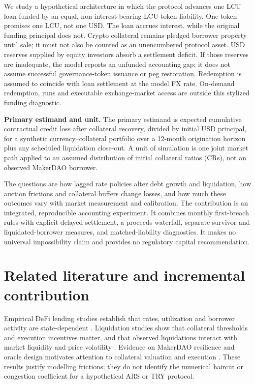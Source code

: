 \documentclass[11pt,a4paper]{article}
\begin{document}
We study a hypothetical architecture in which the protocol advances one LCU loan funded by an equal, non-interest-bearing LCU token liability. One token promises one LCU, not one USD. The loan accrues interest, while the original funding principal does not. Crypto collateral remains pledged borrower property until sale; it must not also be counted as an unencumbered protocol asset. USD reserves supplied by equity investors absorb a settlement deficit. If those reserves are inadequate, the model reports an unfunded accounting gap; it does not assume successful governance-token issuance or peg restoration. Redemption is assumed to coincide with loan settlement at the model FX rate. On-demand redemption, runs and executable exchange-market access are outside this stylized funding diagnostic.

\textbf{Primary estimand and unit.} The primary estimand is expected cumulative contractual credit loss after collateral recovery, divided by initial USD principal, for a synthetic currency--collateral portfolio over a 12-month origination horizon plus any scheduled liquidation close-out. A unit of simulation is one joint market path applied to an assumed distribution of initial collateral ratios (CRs), not an observed MakerDAO borrower.

The questions are how lagged rate policies alter debt growth and liquidation, how auction frictions and collateral buffers change losses, and how much these outcomes vary with market measurement and calibration. The contribution is an integrated, reproducible accounting experiment. It combines monthly first-breach rules with explicit delayed settlement, a proceeds waterfall, separate survivor and liquidated-borrower measures, and matched-liability diagnostics. It makes no universal impossibility claim and provides no regulatory capital recommendation.

\section{Related literature and incremental contribution}
Empirical DeFi lending studies establish that rates, utilization and borrower activity are state-dependent \cite{Gudgeon2020Funds,Saengchote2023,Cornelli2025}. Liquidation studies show that collateral thresholds and execution incentives matter, and that observed liquidations interact with market liquidity and price volatility \cite{Qin2021Liquidations,Perez2021,SasiBrodesky2023}. Evidence on MakerDAO resilience and oracle design motivates attention to collateral valuation and execution \cite{Kjaer2021,Eskandari2021}. These results justify modelling frictions; they do not identify the numerical haircut or congestion coefficient for a hypothetical ARS or TRY protocol.
\end{document}
